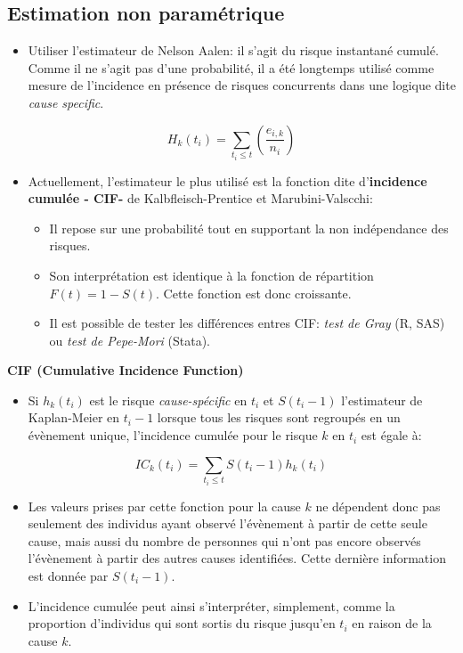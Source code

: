 \documentclass[
  12pt,
  letterpaper,
  DIV=11,
  numbers=noendperiod,
  onepage,
  openany]{scrreprt}
\providecommand{\tightlist}{%
  \setlength{\itemsep}{0pt}\setlength{\parskip}{0pt}}\usepackage{longtable,booktabs,array}
\begin{document}
\hypertarget{estimation-non-paramuxe9trique}{%
\subsection{Estimation non
paramétrique}\label{estimation-non-paramuxe9trique}}

\begin{itemize}
\tightlist
\item
  Utiliser l'estimateur de Nelson Aalen: il s'agit du risque instantané
  cumulé. Comme il ne s'agit pas d'une probabilité, il a été longtemps
  utilisé comme mesure de l'incidence en présence de risques concurrents
  dans une logique dite \emph{cause specific}.
\end{itemize}

\[H_k (t_i)=\sum_{t_i\leq t}\left(\frac{e_{i,k}}{n_i}\right) \]

\begin{itemize}
\item
  Actuellement, l'estimateur le plus utilisé est la fonction dite
  d'\textbf{incidence cumulée - CIF-} de Kalbfleisch-Prentice et
  Marubini-Valscchi:

  \begin{itemize}
  \tightlist
  \item
    Il repose sur une probabilité tout en supportant la non indépendance
    des risques.
  \item
    Son interprétation est identique à la fonction de répartition
    \(F(t)=1-S(t)\). Cette fonction est donc croissante.
  \item
    Il est possible de tester les différences entres CIF: \emph{test de
    Gray} (R, SAS) ou \emph{test de Pepe-Mori} (Stata).
  \end{itemize}
\end{itemize}

\textbf{CIF (Cumulative Incidence Function)}

\begin{itemize}
\tightlist
\item
  Si \(h_k(t_i)\) est le risque \emph{cause-spécific} en \(t_i\) et
  \(S(t_i-1)\) l'estimateur de Kaplan-Meier en \(t_i-1\) lorsque tous
  les risques sont regroupés en un évènement unique, l'incidence cumulée
  pour le risque \(k\) en \(t_i\) est égale à:
\end{itemize}

\[IC_k(t_i)= \sum_{t_i\leq t}S(t_i-1)h_k(t_i)\]

\begin{itemize}
\tightlist
\item
  Les valeurs prises par cette fonction pour la cause \(k\) ne dépendent
  donc pas seulement des individus ayant observé l'évènement à partir de
  cette seule cause, mais aussi du nombre de personnes qui n'ont pas
  encore observés l'évènement à partir des autres causes identifiées.
  Cette dernière information est donnée par \(S(t_i-1)\).
\item
  L'incidence cumulée peut ainsi s'interpréter, simplement, comme la
  proportion d'individus qui sont sortis du risque jusqu'en \(t_i\) en
  raison de la cause \(k\).
\end{itemize}
\end{document}
